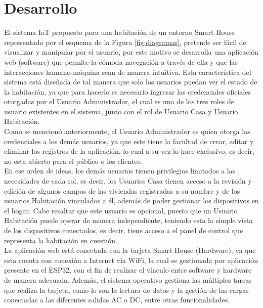 \section{Desarrollo}

El sistema IoT propuesto para una habitación de un entorno Smart House representado por el esquema de la Figura \ref{fig:diagramas}, pretende ser fácil de visualizar y manipular por el usuario, por este motivo se desarrolla una aplicación web (software) que permite la cómoda navegación a través de ella y que las interacciones humano-máquina sean de manera intuitiva. Esta característica del sistema está diseñada de tal manera que solo los usuarios puedan ver el estado de la habitación, ya que para hacerlo es necesario ingresar las credenciales oficiales otorgadas por el Usuario Administrador, el cual es uno de los tres roles de usuario existentes en el sistema, junto con el rol de Usuario Casa y Usuario Habitación.\\

Como se mencionó anteriormente, el Usuario Administrador es quien otorga las credenciales a los demás usuarios, ya que este tiene la facultad de crear, editar y eliminar los registros de la aplicación, lo cual a su vez lo hace exclusivo, es decir, no esta abierto para el público o los clientes.\\ 

En ese orden de ideas, los demás usuarios tienen privilegios limitados a las necesidades de cada rol, es decir, los Usuarios Casa tienen acceso a la revisión y edición de algunos campos de las viviendas registradas a su nombre y de los usuarios Habitación vinculados a él, además de poder gestionar los dispositivos en el hogar. Cabe resaltar que este usuario es opcional, puesto que un Usuario Habitación puede operar de manera independiente, teniendo esta la simple vista de los dispositivos conectados, es decir, tiene acceso a el panel de control que representa la habitación en cuestión.\\
 
La aplicación web está conectada con la tarjeta Smart House (Hardware), ya que esta cuenta con conexión a Internet vía WiFi, la cual es gestionada por aplicación presente en el ESP32, con el fin de realizar el vínculo entre software y hardware de manera adecuada. Además, el sistema operativo gestiona las múltiples tareas que realiza la tarjeta, como lo son la lectura de datos y la gestión de las cargas conectadas a las diferentes salidas AC o DC, entre otras funcionalidades.\\


